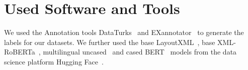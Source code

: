 \section{Used Software and Tools}
We used the Annotation tools DataTurks~\cite{dataturks} and EXannotator~\cite{excite_toolchain} to generate the labels for our datasets. We further used the base LayoutXML~\cite{hug_layoutxlm}, base XML-RoBERTa~\cite{hug_xlmr}, multilingual uncased~\cite{hug_uncased_bert} and cased BERT~\cite{hug_cased_bert} models from the data science platform Hugging Face~\cite{wolf2019huggingface}.
